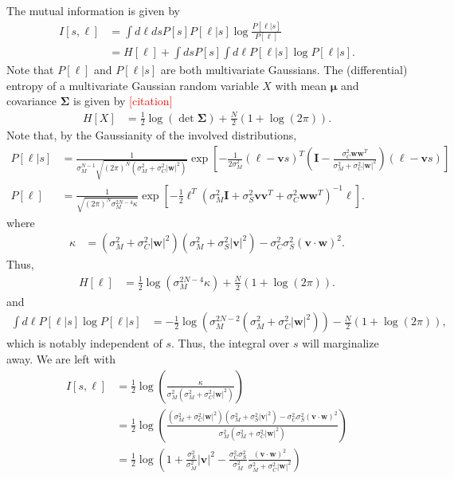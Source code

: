 \documentclass[11pt]{article}
\begin{document}
	The mutual information is given by 
	\begin{align}
		I[s, \boldsymbol{\ell}] &= \int d\boldsymbol{\ell} ds  P[s] P[\boldsymbol{\ell}|s]\log \frac{P[\boldsymbol{\ell}|s]}{P[\boldsymbol{\ell}]} \\
		&= H[\boldsymbol{\ell}] + \int ds P[s] \int d\boldsymbol{\ell} P[\boldsymbol{\ell}|s] \log P[\boldsymbol{\ell}|s].
	\end{align}
	Note that $P[\boldsymbol{\ell}]$ and $P[\boldsymbol{\ell}|s]$ are both multivariate Gaussians. The (differential) entropy of a multivariate Gaussian random variable $X$ with mean $\boldsymbol{\mu}$ and covariance $\boldsymbol{\Sigma}$ is given by \textcolor{red}{[citation]}
	\begin{align}
		H[X] &= \frac{1}{2} \log \left(\det\boldsymbol{\Sigma}\right) + \frac{N}{2} (1 + \log(2\pi)).
	\end{align}
	Note that, by the Gaussianity of the involved distributions, 
	\begin{align}
		P[\boldsymbol{\ell}|s] &= \frac{1}{\sigma_M^{N-1} \sqrt{(2\pi)^N(\sigma_M^2 + \sigma_C^2 |\mathbf{w}|^2)}} \exp\left[-\frac{1}{2\sigma_M^2} (\boldsymbol{\ell} - \mathbf{v}s)^T\left(\mathbf{I} - \frac{\sigma_C^2 \mathbf{ww}^T}{\sigma_M^2 + \sigma_C^2 |\mathbf{w}|^2}\right) (\boldsymbol{\ell} - \mathbf{v}s) \right] \\
		P[\boldsymbol{\ell}] &= \frac{1}{ \sqrt{(2\pi)^N \sigma_M^{2N-4}\kappa}} \exp\left[-\frac{1}{2}\boldsymbol{\ell}^T \left(\sigma_M^2 \mathbf{I} + \sigma_S^2 \mathbf{vv}^T + \sigma_C^2 \mathbf{ww}^T\right)^{-1} \boldsymbol{\ell}\right].
	\end{align}
	where 
	\begin{align}
		\kappa &= (\sigma_M^2 + \sigma_C^2 |\mathbf{w}|^2)(\sigma_M^2 + \sigma_S^2 |\mathbf{v}|^2) - \sigma_C^2 \sigma_S^2 (\mathbf{v}\cdot\mathbf{w})^2.
	\end{align}
	Thus,
	\begin{align}
		H[\boldsymbol{\ell}] &= \frac{1}{2}\log( \sigma_M^{2N-4} \kappa) + \frac{N}{2}(1 + \log(2\pi)).
	\end{align}
	and 
	\begin{align}
		\int d\boldsymbol{\ell} P[\boldsymbol{\ell}|s] \log P[\boldsymbol{\ell}|s] &= -\frac{1}{2}\log(\sigma_M^{2N-2} (\sigma_M^2 +\sigma_C^2 |\mathbf{w}|^2)) - \frac{N}{2} (1+\log(2\pi)),
	\end{align}
	which is notably independent of $s$. Thus, the integral over $s$ will marginalize away. We are left with
	\begin{align}
		I[s,\boldsymbol{\ell}] &= \frac{1}{2}\log\left(\frac{\kappa}{\sigma_M^2 (\sigma_M^2 + \sigma_C^2 |\mathbf{w}|^2)}\right) \\
		&= \frac{1}{2} \log \left(\frac{ (\sigma_M^2 + \sigma_C^2 |\mathbf{w}|^2)(\sigma_M^2 + \sigma_S^2 |\mathbf{v}|^2) - \sigma_C^2 \sigma_S^2 (\mathbf{v}\cdot\mathbf{w})^2}{\sigma_M^2 (\sigma_M^2 + \sigma_C^2 |\mathbf{w}|^2)}\right) \\
		&= \frac{1}{2} \log \left(1 + \frac{\sigma_S^2}{\sigma_M^2} |\mathbf{v}|^2 - \frac{\sigma_C^2 \sigma_S^2}{\sigma_M^2} \frac{(\mathbf{v}\cdot\mathbf{w})^2}{\sigma_M^2 + \sigma_C^2 |\mathbf{w}|^2}\right)
	\end{align}
\end{document}

